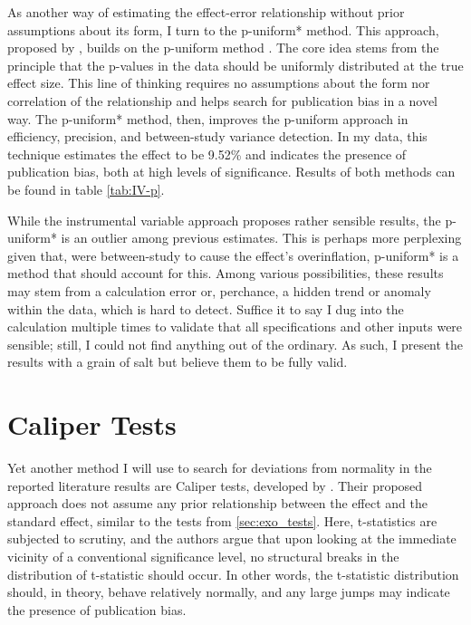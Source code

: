 As another way of estimating the effect-error relationship without prior assumptions about its form, I turn to the p-uniform* method. This approach, proposed by \cite{vanAert2021puni}, builds on the p-uniform method \citep{van2016conducting}. The core idea stems from the principle that the p-values in the data should be uniformly distributed at the true effect size. This line of thinking requires no assumptions about the form nor correlation of the relationship and helps search for publication bias in a novel way. The p-uniform* method, then, improves the p-uniform approach in efficiency, precision, and between-study variance detection. In my data, this technique estimates the effect to be 9.52\% and indicates the presence of publication bias, both at high levels of significance. Results of both methods can be found in table \autoref{tab:IV-p}. 

While the instrumental variable approach proposes rather sensible results, the p-uniform* is an outlier among previous estimates. This is perhaps more perplexing given that, were between-study to cause the effect's overinflation, p-uniform* is a method that should account for this. Among various possibilities, these results may stem from a calculation error or, perchance, a hidden trend or anomaly within the data, which is hard to detect. Suffice it to say I dug into the calculation multiple times to validate that all specifications and other inputs were sensible; still, I could not find anything out of the ordinary. As such, I present the results with a grain of salt but believe them to be fully valid.


\section{Caliper Tests}
\label{sec:caliper}

Yet another method I will use to search for deviations from normality in the reported literature results are Caliper tests, developed by \cite{gerber2008caliper}. Their proposed approach does not assume any prior relationship between the effect and the standard effect, similar to the tests from \autoref{sec:exo_tests}. Here, t-statistics are subjected to scrutiny, and the authors argue that upon looking at the immediate vicinity of a conventional significance level, no structural breaks in the distribution of t-statistic should occur. In other words, the t-statistic distribution should, in theory, behave relatively normally, and any large jumps may indicate the presence of publication bias.

